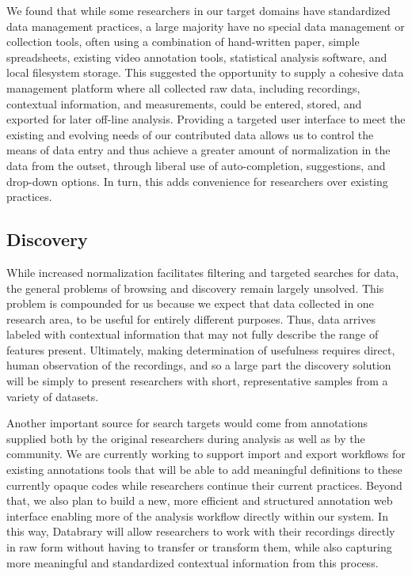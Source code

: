 \documentclass{sig-alternate}
\begin{document}
We found that while some researchers in our target domains have standardized data management practices, a large majority have no special data management or collection tools, often using a combination of hand-written paper, simple spreadsheets, existing video annotation tools, statistical analysis software, and local filesystem storage.
This suggested the opportunity to supply a cohesive data management platform where all collected raw data, including recordings, contextual information, and measurements, could be entered, stored, and exported for later off-line analysis.
Providing a targeted user interface to meet the existing and evolving needs of our contributed data allows us to control the means of data entry and thus achieve a greater amount of normalization in the data from the outset, through liberal use of auto-completion, suggestions, and drop-down options.
In turn, this adds convenience for researchers over existing practices.

\subsection{Discovery}

While increased normalization facilitates filtering and targeted searches for data, the general problems of browsing and discovery remain largely unsolved.
This problem is compounded for us because we expect that data collected in one research area, to be useful for entirely different purposes.
Thus, data arrives labeled with contextual information that may not fully describe the range of features present.
Ultimately, making determination of usefulness requires direct, human observation of the recordings, and so a large part the discovery solution will be simply to present researchers with short, representative samples from a variety of datasets.

Another important source for search targets would come from annotations supplied both by the original researchers during analysis as well as by the community.
We are currently working to support import and export workflows for existing annotations tools that will be able to add meaningful definitions to these currently opaque codes while researchers continue their current practices.
Beyond that, we also plan to build a new, more efficient and structured annotation web interface enabling more of the analysis workflow directly within our system.
In this way, Databrary will allow researchers to work with their recordings directly in raw form without having to transfer or transform them, while also capturing more meaningful and standardized contextual information from this process.
\end{document}
